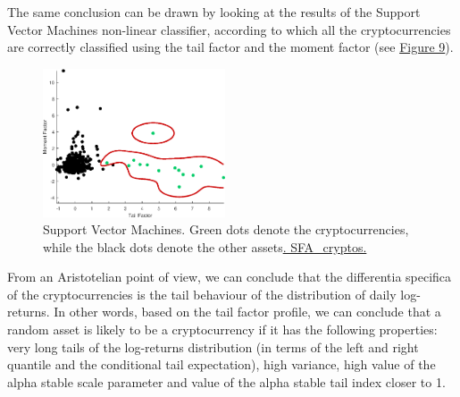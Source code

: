 The same conclusion can be drawn by looking at the results of the Support Vector Machines non-linear classifier, according to which all the cryptocurrencies are correctly classified using the tail factor and the moment factor (see \hyperref[fig:figure_9]{Figure 9}).

\begin{figure}[!ht]
\centering
\includegraphics[width=0.48\textwidth]{Fig/figure_9}
\caption{ Support Vector Machines. Green dots denote the cryptocurrencies, while the black dots denote the other assets\href{https://github.com/QuantLet/Genus_proximum_cryptos/tree/master/SFA_Cryptos}{. SFA\_cryptos.}}
	\label{fig:figure_9}
\end{figure}

From an Aristotelian point of view, we can conclude that the differentia specifica of the cryptocurrencies is the tail behaviour of the distribution of daily log-returns.
In other words, based on the tail factor profile, we can conclude that a random asset is likely to be a cryptocurrency if it has the following properties: very long tails of the log-returns distribution (in terms of the left and right quantile and the conditional tail expectation), high variance, high value of the alpha stable scale parameter and value of the alpha stable tail index closer to 1.


